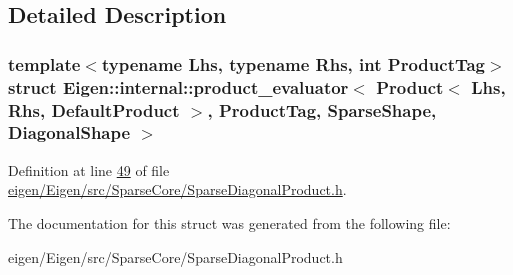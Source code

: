 \subsection{Detailed Description}
\subsubsection*{template$<$typename Lhs, typename Rhs, int Product\+Tag$>$\newline
struct Eigen\+::internal\+::product\+\_\+evaluator$<$ Product$<$ Lhs, Rhs, Default\+Product $>$, Product\+Tag, Sparse\+Shape, Diagonal\+Shape $>$}



Definition at line \hyperlink{eigen_2_eigen_2src_2_sparse_core_2_sparse_diagonal_product_8h_source_l00049}{49} of file \hyperlink{eigen_2_eigen_2src_2_sparse_core_2_sparse_diagonal_product_8h_source}{eigen/\+Eigen/src/\+Sparse\+Core/\+Sparse\+Diagonal\+Product.\+h}.



The documentation for this struct was generated from the following file\+:\begin{DoxyCompactItemize}
\item 
eigen/\+Eigen/src/\+Sparse\+Core/\+Sparse\+Diagonal\+Product.\+h\end{DoxyCompactItemize}
